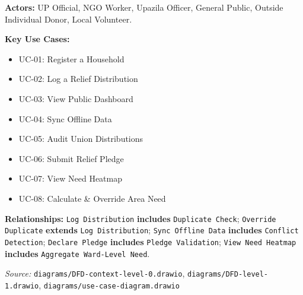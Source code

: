 \textbf{Actors:} UP Official, NGO Worker, Upazila Officer, General Public, Outside Individual Donor, Local Volunteer.

\textbf{Key Use Cases:}
\begin{itemize}[nosep]
    \item UC-01: Register a Household
    \item UC-02: Log a Relief Distribution
    \item UC-03: View Public Dashboard
    \item UC-04: Sync Offline Data
    \item UC-05: Audit Union Distributions
    \item UC-06: Submit Relief Pledge
    \item UC-07: View Need Heatmap
    \item UC-08: Calculate \& Override Area Need
\end{itemize}

\textbf{Relationships:} \texttt{Log Distribution} \textbf{includes} \texttt{Duplicate Check}; \texttt{Override Duplicate} \textbf{extends} \texttt{Log Distribution}; \texttt{Sync Offline Data} \textbf{includes} \texttt{Conflict Detection}; \texttt{Declare Pledge} \textbf{includes} \texttt{Pledge Validation}; \texttt{View Need Heatmap} \textbf{includes} \texttt{Aggregate Ward-Level Need}.

\noindent\textit{Source:} \texttt{diagrams/DFD-context-level-0.drawio}, \texttt{diagrams/DFD-level-1.drawio}, \texttt{diagrams/use-case-diagram.drawio}

